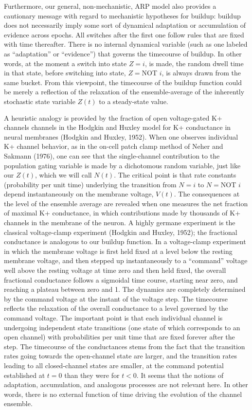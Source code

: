 Furthermore, our general, non-mechanistic, ARP model also provides a cautionary message with regard to mechanistic hypotheses for buildup: buildup does not necessarily imply some sort of dynamical adaptation or accumulation of evidence across epochs. All switches after the first one follow rules that are fixed with time thereafter. There is no internal dynamical variable (such as one labeled as “adaptation” or “evidence”) that governs the timecourse of buildup. In other words, at the moment a switch into state $Z=i$, is made, the random dwell time in that state, before switching into state, $Z=$NOT $i$, is always drawn from the same bucket. From this viewpoint, the timecourse of the buildup function could be merely a reflection of the relaxation of the ensemble-average of the inherently stochastic state variable $Z(t)$ to a steady-state value.

A heuristic analogy is provided by the fraction of open voltage-gated K+ channels channels in the Hodgkin and Huxley model for K+ conductance in neural membranes (Hodgkin and Huxley, 1952). When one observes individual K+ channel behavior, as in the on-cell patch clamp method of Neher and Sakmann (1976), one can see that the single-channel contribution to the population gating variable is made by a dichotomous random variable, just like our $Z(t)$, which we will call $N(t)$. The critical point is that rate constants (probability per unit time) underlying the transition from $N=i$ to $N=$NOT $i$ depend instantaneously on the membrane voltage, $V(t)$. The consequences at the level of the ensemble average are revealed when one measures the net fraction of maximal K+ conductance, in which contributions made by thousands of K+ channels in the membrane of the neuron.  A highly germane experiment is the classical voltage-clamp experiment (Hodgkin and Huxley, 1952); the fractional conductance is analogous to our buildup function. In a voltage-clamp experiment in which the membrane voltage is first held fixed at a level below the resting membrane voltage, and then stepped up instantaneously to a “command” voltage well above the resting voltage at time zero and then held fixed, the overall fractional conductance follows a sigmoidal time course, starting near zero, and reaching a plateau between zero and 1. The dynamics are completely determined by the command voltage at the instant of the voltage step. The timecourse reflects the relaxation of the overall conductance to a level governed by the command voltage. The important point is that each individual channel is undergoing independent state transitions (one state of which corresponds to an open channel) with probabilities per unit time that are fixed forever after the step. The timecourse of the conductances stems from the fact that the transition rates going towards the open-channel state are larger, and the transition rates leading to all closed-channel states are smaller, at the command potential established at $t=0$ than they were for $t<0$. It seems that the notions of adaptation, accumulation, and analogous processes are not relevant here. In other words, there is no external function of time driving the evolution of the channel ensemble.

